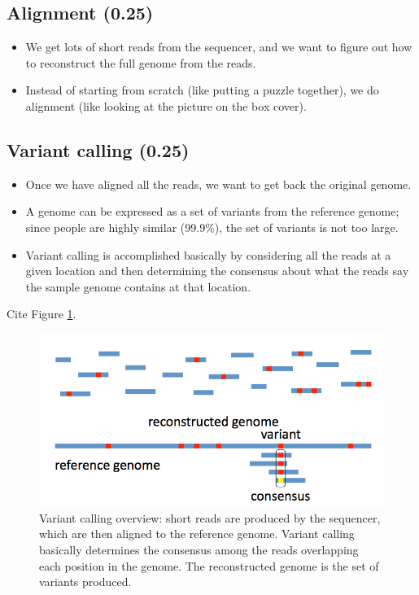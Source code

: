 \documentclass[10pt]{article}
\begin{document}
\subsection{Alignment (0.25)}
\begin{itemize}
\item{We get lots of short reads from the sequencer, and we want to figure out how to reconstruct the full genome from the reads.}
\item{Instead of starting from scratch (like putting a puzzle together), we do alignment (like looking at the picture on the box cover).}
\end{itemize}
\subsection{Variant calling (0.25)}
\begin{itemize}
\item{Once we have aligned all the reads, we want to get back the original genome.}
\item{A genome can be expressed as a set of variants from the reference genome; since people are highly similar (99.9\%), the set of variants is not too large.}
\item{Variant calling is accomplished basically by considering all the reads at a given location and then determining the consensus about what the reads say the sample genome contains at that location.}
\end{itemize}
Cite Figure \ref{fig:variantCallingOverview}.
\begin{figure}
\centering
\includegraphics[scale=0.5]{variantCallingOverview}
\caption{Variant calling overview:  short reads are produced by the sequencer, which are then aligned to the reference genome.  Variant calling basically determines the consensus among the reads overlapping each position in the genome.  The reconstructed genome is the set of variants produced.}
\label{fig:variantCallingOverview}
\end{figure}
\end{document}
